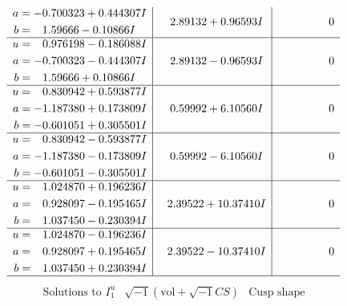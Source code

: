 \documentclass[1p]{elsarticle_modified}
\theoremstyle{definition}
\newcommand{\I}{\sqrt{-1}}
\begin{document}
$$\begin{array}{c|c|c}
\begin{aligned}
a &= -0.700323 + 0.444307 I \\
b &= \phantom{-}1.59666 - 0.10866 I\end{aligned}
 & \phantom{-}2.89132 + 0.96593 I & \phantom{-0.000000 } 0 \\ \hline\begin{aligned}
u &= \phantom{-}0.976198 - 0.186088 I \\
a &= -0.700323 - 0.444307 I \\
b &= \phantom{-}1.59666 + 0.10866 I\end{aligned}
 & \phantom{-}2.89132 - 0.96593 I & \phantom{-0.000000 } 0 \\ \hline\begin{aligned}
u &= \phantom{-}0.830942 + 0.593877 I \\
a &= -1.187380 + 0.173809 I \\
b &= -0.601051 + 0.305501 I\end{aligned}
 & \phantom{-}0.59992 + 6.10560 I & \phantom{-0.000000 } 0 \\ \hline\begin{aligned}
u &= \phantom{-}0.830942 - 0.593877 I \\
a &= -1.187380 - 0.173809 I \\
b &= -0.601051 - 0.305501 I\end{aligned}
 & \phantom{-}0.59992 - 6.10560 I & \phantom{-0.000000 } 0 \\ \hline\begin{aligned}
u &= \phantom{-}1.024870 + 0.196236 I \\
a &= \phantom{-}0.928097 - 0.195465 I \\
b &= \phantom{-}1.037450 - 0.230394 I\end{aligned}
 & \phantom{-}2.39522 + 10.37410 I & \phantom{-0.000000 } 0 \\ \hline\begin{aligned}
u &= \phantom{-}1.024870 - 0.196236 I \\
a &= \phantom{-}0.928097 + 0.195465 I \\
b &= \phantom{-}1.037450 + 0.230394 I\end{aligned}
 & \phantom{-}2.39522 - 10.37410 I & \phantom{-0.000000 } 0\\
 \hline 
 \end{array}$$\newpage$$\begin{array}{c|c|c}  
\text{Solutions to }I^u_{1}& \I (\text{vol} + \sqrt{-1}CS) & \text{Cusp shape}\\
 \hline 
\begin{aligned}

\end{aligned}
\end{array}$$
\end{document}
